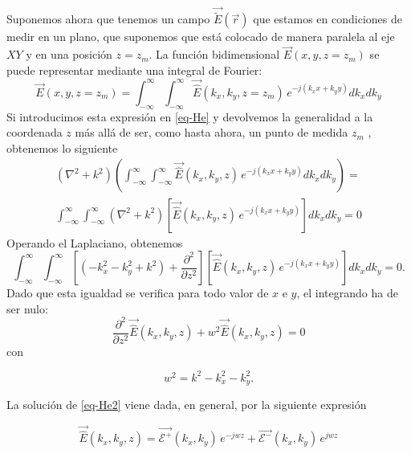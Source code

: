 \documentclass[twocolumn,tikz]{handout}
\begin{document}
Suponemos ahora que tenemos un campo $\vec{\tilde{E}}(\vec{r})$ que
estamos en condiciones de medir en un plano, que suponemos que está
colocado de manera paralela al eje $XY$ y en una posición $z=z_{m}$.
La función bidimensional $\vec{E}(x,y,z=z_{m})$ se puede representar
mediante una integral de Fourier:
\begin{equation}
\vec{E}(x,y,z=z_{m})=\int_{-\infty}^{\infty}\int_{-\infty}^{\infty}\vec{\hat{E}}(k_{x},k_{y},z=z_{m})
\,e^{-j (k_{x} x+k_{y} y)} dk_{x} dk_{y}
\label{eq-fourier1}
\end{equation}
Si introducimos esta expresión en \eqref{eq-He} y devolvemos la
generalidad a la coordenada $z$ más allá de ser, como hasta ahora,
un punto de medida $z_{m}$ , obtenemos lo siguiente
\begin{multline}
\left(\nabla^{2}+k^{2}\right)\left(\int_{-\infty}^{\infty}\int_{-\infty}^{\infty}\vec{\hat{E}}(k_{x},k_{y},z)
\,e^{-j (k_{x} x+k_{y} y)} dk_{x}
dk_{y}\right)=\\
\int_{-\infty}^{\infty}\int_{-\infty}^{\infty}\left(\nabla^{2}+k^{2}\right)\left[\vec{\hat{E}}(k_{x},k_{y},z)
\,e^{-j (k_{x} x+k_{y} y)}\right] dk_{x} dk_{y}=0
\label{eq-fourier1andHe}
\end{multline}
Operando el Laplaciano, obtenemos
\begin{equation}
\int_{-\infty}^{\infty}\int_{-\infty}^{\infty}\left[\left(-k_{x}^{2}-k_{y}^{2}+k^{2}\right)+\frac{\partial^{2}}{\partial
z^{2}}\right]\left[\vec{\hat{E}}(k_{x},k_{y},z) \,e^{-j (k_{x}
x+k_{y} y)}\right] dk_{x} dk_{y}=0.
\label{eq-fourier1andHe2}
\end{equation}
Dado que esta igualdad se verifica para todo valor de $x$ e $y$, el
integrando ha de ser nulo:
\begin{equation}
\frac{\partial^{2}}{\partial
z^{2}}\vec{\hat{E}}(k_{x},k_{y},z)+w^{2}\vec{\hat{E}}(k_{x},k_{y},z)=0
\label{eq-He2}
\end{equation}
con

\begin{equation}
w^{2}=k^{2}-k_{x}^{2}-k_{y}^{2}.
\end{equation}

La solución de \eqref{eq-He2} viene dada, en general, por la
siguiente expresión

\begin{equation}
\vec{\hat{E}}(k_{x},k_{y},z)=\vec{\mathcal{E}^{+}}(k_{x},k_{y})\,e^{-j
w z}+\vec{\mathcal{E}^{-}}(k_{x},k_{y})\,e^{j w z}
\label{eq-eplus}
\end{equation}
\end{document}
